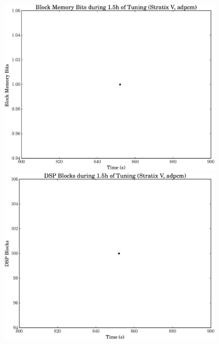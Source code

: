 \documentclass[12pt, a4paper]{article}
\begin{document}
\begin{figure}[htpb]
    \begin{minipage}{.48\textwidth}
        \includegraphics[scale=.25]{adpcm_block_5400_chstone_StratixV}
    \end{minipage}%
    \hfill
    \begin{minipage}{.48\textwidth}
        \includegraphics[scale=.25]{adpcm_dsp_5400_chstone_StratixV}
    \end{minipage}%


\end{figure}
\end{document}

